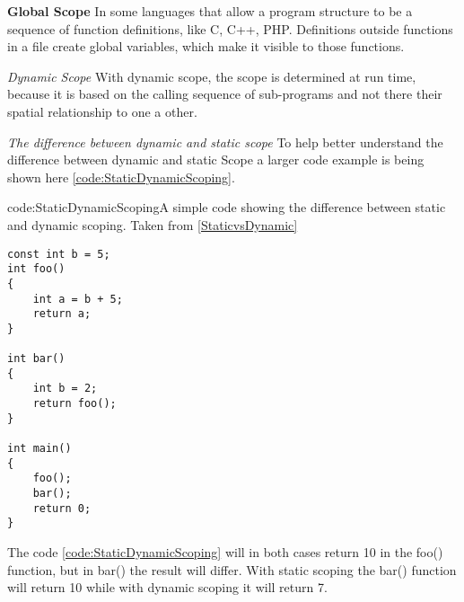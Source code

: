 \textbf{Global Scope}
In some languages that allow a program structure to be a sequence of function definitions, like C, C++, PHP. Definitions outside functions in a file create global variables, which make it  visible to those functions.

\textit{Dynamic Scope}
With dynamic scope, the scope is determined at run time, because it is based on the calling sequence of sub-programs and not there their spatial relationship to one a other.

\textit{The difference between dynamic and static scope}
To help better understand the difference between dynamic and static Scope a larger code example is being shown here \ref{code:StaticDynamicScoping}.
\begin{code}{code:StaticDynamicScoping}{A simple code showing the difference between static and dynamic scoping. Taken from \ref{StaticvsDynamic}}
\begin{lstlisting}
const int b = 5;
int foo()
{
	int a = b + 5;
	return a;
}

int bar()
{
	int b = 2;
	return foo();
}

int main()
{
	foo();
	bar();
	return 0;
}
\end{lstlisting}
\end{code}
The code \ref{code:StaticDynamicScoping} will in both cases return 10 in the foo() function, but in bar() the result will differ. With static scoping the bar() function will return 10 while with dynamic scoping it will return 7.













